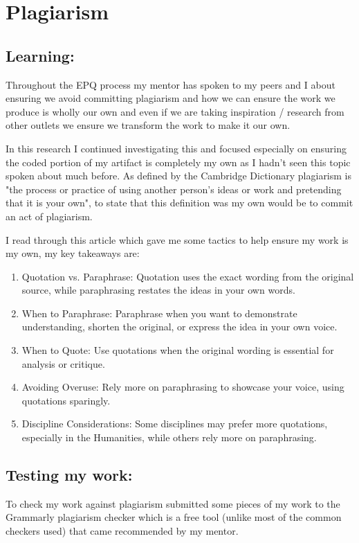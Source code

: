 \section{Plagiarism}
\label{research:Plagiarism}
\subsection*{Learning:}
Throughout the EPQ process my mentor has spoken to my peers and I about ensuring we avoid committing plagiarism and how we can ensure the work we produce is wholly our own and even if we are taking inspiration / research from other outlets we ensure we transform the work to make it our own.

In this research I continued investigating this and focused especially on ensuring the coded portion of my artifact is completely my own as I hadn't seen this topic spoken about much before. As defined by the Cambridge Dictionary plagiarism is "the process or practice of using another person's ideas or work and pretending that it is your own", to state that this definition was my own would be to commit an act of plagiarism.


I read through this article \cite{PlagiarismAcademicSkills} which gave me some tactics to help ensure my work is my own, my key takeaways are:
\begin{enumerate}
    \item Quotation vs. Paraphrase: Quotation uses the exact wording from the original source, while paraphrasing restates the ideas in your own words.
    \item When to Paraphrase: Paraphrase when you want to demonstrate understanding, shorten the original, or express the idea in your own voice.
    \item When to Quote: Use quotations when the original wording is essential for analysis or critique.
    \item Avoiding Overuse: Rely more on paraphrasing to showcase your voice, using quotations sparingly.
    \item Discipline Considerations: Some disciplines may prefer more quotations, especially in the Humanities, while others rely more on paraphrasing.
\end{enumerate}


\subsection*{Testing my work:}
To check my work against plagiarism submitted some pieces of my work to the Grammarly plagiarism checker \cite{PlagiarismCheckerGrammarly} which is a free tool (unlike most of the common checkers used) that came recommended by my mentor.

